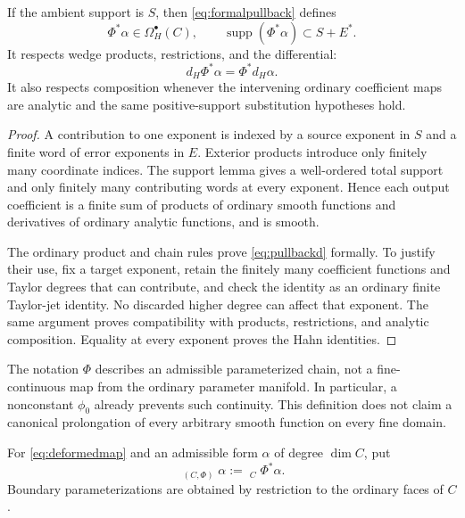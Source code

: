 \documentclass[11pt,letterpaper]{article}
\theoremstyle{definition}
\theoremstyle{remark}
\newcommand{\supp}{\operatorname{supp}}\newcommand{\Res}{\operatorname{Res}}
\newcommand{\HInt}{\mathop{\int^{\!H}}\nolimits}
\numberwithin{equation}{section}
\begin{document}
\begin{lemma}\label{lem:pullback}
If the ambient support is $S$, then \eqref{eq:formalpullback} defines
\[
 \Phi^*\alpha\in\Omega_H^\bullet(C),\qquad
 \supp(\Phi^*\alpha)\subset S+E^*.
\]
It respects wedge products, restrictions, and the differential:
\begin{equation}\label{eq:pullbackd}
 d_H\Phi^*\alpha=\Phi^*d_H\alpha.
\end{equation}
It also respects composition whenever the intervening ordinary coefficient maps are analytic and the same positive-support substitution hypotheses hold.
\end{lemma}
\begin{proof}
A contribution to one exponent is indexed by a source exponent in $S$ and a finite word of error exponents in $E$. Exterior products introduce only finitely many coordinate indices. The support lemma gives a well-ordered total support and only finitely many contributing words at every exponent. Hence each output coefficient is a finite sum of products of ordinary smooth functions and derivatives of ordinary analytic functions, and is smooth.

The ordinary product and chain rules prove \eqref{eq:pullbackd} formally. To justify their use, fix a target exponent, retain the finitely many coefficient functions and Taylor degrees that can contribute, and check the identity as an ordinary finite Taylor-jet identity. No discarded higher degree can affect that exponent. The same argument proves compatibility with products, restrictions, and analytic composition. Equality at every exponent proves the Hahn identities.
\end{proof}

The notation $\Phi$ describes an admissible parameterized chain, not a fine-continuous map from the ordinary parameter manifold. In particular, a nonconstant $\phi_0$ already prevents such continuity. This definition does not claim a canonical prolongation of every arbitrary smooth function on every fine domain.

\begin{definition}
For \eqref{eq:deformedmap} and an admissible form $\alpha$ of degree $\dim C$, put
\[
 \HInt_{(C,\Phi)}\alpha:=\HInt_C\Phi^*\alpha.
\]
Boundary parameterizations are obtained by restriction to the ordinary faces of $C$.
\end{definition}
\end{document}
